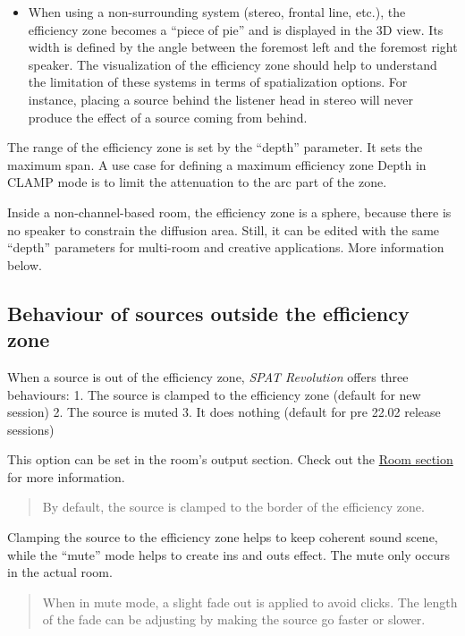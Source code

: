 \documentclass[
  letterpaper,
  DIV=11,
  numbers=noendperiod]{scrreport}
\providecommand{\tightlist}{%
  \setlength{\itemsep}{0pt}\setlength{\parskip}{0pt}}\usepackage{longtable,booktabs,array}
\begin{document}
\begin{itemize}
\tightlist
\item
  When using a non-surrounding system (stereo, frontal line, etc.), the
  efficiency zone becomes a ``piece of pie'' and is displayed in the 3D
  view. Its width is defined by the angle between the foremost left and
  the foremost right speaker. The visualization of the efficiency zone
  should help to understand the limitation of these systems in terms of
  spatialization options. For instance, placing a source behind the
  listener head in stereo will never produce the effect of a source
  coming from behind.
\end{itemize}

The range of the efficiency zone is set by the ``depth'' parameter. It
sets the maximum span. A use case for defining a maximum efficiency zone
Depth in CLAMP mode is to limit the attenuation to the arc part of the
zone.

Inside a non-channel-based room, the efficiency zone is a sphere,
because there is no speaker to constrain the diffusion area. Still, it
can be edited with the same ``depth'' parameters for multi-room and
creative applications. More information below.

\hypertarget{behaviour-of-sources-outside-the-efficiency-zone}{%
\subsection{Behaviour of sources outside the efficiency
zone}\label{behaviour-of-sources-outside-the-efficiency-zone}}

When a source is out of the efficiency zone, \emph{SPAT Revolution}
offers three behaviours: 1. The source is clamped to the efficiency zone
(default for new session) 2. The source is muted 3. It does nothing
(default for pre 22.02 release sessions)

This option can be set in the room's output section. Check out the
\href{Spat_Environment_Room.md}{Room section} for more information.

\begin{quote}
By default, the source is clamped to the border of the efficiency zone.
\end{quote}

Clamping the source to the efficiency zone helps to keep coherent sound
scene, while the ``mute'' mode helps to create ins and outs effect. The
mute only occurs in the actual room.

\begin{quote}
When in mute mode, a slight fade out is applied to avoid clicks. The
length of the fade can be adjusting by making the source go faster or
slower.
\end{quote}
\end{document}
